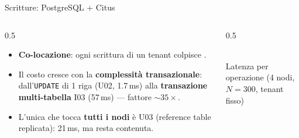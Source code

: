 \documentclass[aspectratio=169,11pt]{beamer}
\begin{document}
\begin{frame}{Scritture: PostgreSQL + Citus}
  \begin{columns}[c]
    \begin{column}{0.5\textwidth}
      \small
      \begin{itemize}\setlength\itemsep{5pt}
        \item \textbf{Co-locazione}: ogni scrittura di un tenant colpisce .
        \item Il costo cresce con la \textbf{complessità transazionale}: dall'\texttt{UPDATE} di 1 riga
              (U02, 1.7\,ms) alla \textbf{transazione multi-tabella} I03 (57\,ms) --- fattore ${\sim}35\times$.
        \item L'unica che tocca \textbf{tutti i nodi} è U03 (reference table replicata): 21\,ms, ma resta contenuta.
      \end{itemize}
    \end{column}
    \begin{column}{0.5\textwidth}
      \centering
      \\
      {\scriptsize\color{grigio}Latenza per operazione (4 nodi, $N{=}300$, tenant fisso)}
    \end{column}
  \end{columns}
\end{frame}
\end{document}
